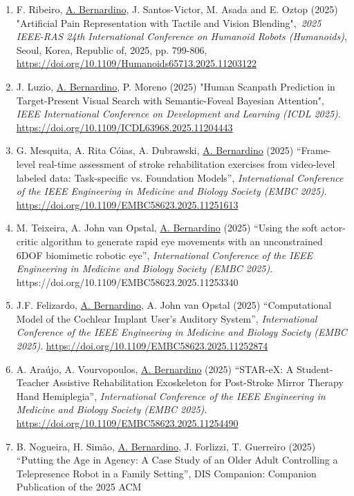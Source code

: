 \begin{enumerate}
  \url{https://doi.org/10.1007/978-3-031-99568-2_14}
\item
  F. Ribeiro, \ul{A. Bernardino}, J. Santos-Victor, M. Asada and E.
  Oztop (2025) "Artificial Pain Representation with Tactile and Vision
  Blending",~\emph{2025 IEEE-RAS 24th International Conference on
  Humanoid Robots (Humanoids)}, Seoul, Korea, Republic of, 2025, pp.
  799-806, \url{https://doi.org/10.1109/Humanoids65713.2025.11203122}
\item
  J. Luzio, \ul{A. Bernardino}, P. Moreno (2025) "Human Scanpath
  Prediction in Target-Present Visual Search with Semantic-Foveal
  Bayesian Attention", \emph{IEEE International Conference on
  Development and Learning (ICDL 2025)}.
  \url{https://doi.org/10.1109/ICDL63968.2025.11204443}
\item
  G. Mesquita, A. Rita Cóias, A. Dubrawski, \ul{A. Bernardino} (2025)
  ``Frame-level real-time assessment of stroke rehabilitation exercises
  from video-level labeled data: Task-specific vs. Foundation Models'',
  \emph{International Conference of the IEEE Engineering in Medicine and
  Biology Society (EMBC 2025)}.
  \url{https://doi.org/10.1109/EMBC58623.2025.11251613}
\item
  M. Teixeira, A. John van Opstal, \ul{A. Bernardino} (2025) ``Using the
  soft actor-critic algorithm to generate rapid eye movements with an
  unconstrained 6DOF biomimetic robotic eye'', \emph{International
  Conference of the IEEE Engineering in Medicine and Biology Society
  (EMBC 2025)}. https://doi.org/10.1109/EMBC58623.2025.11253340
\item
  J.F. Felizardo, \ul{A. Bernardino}, A. John van Opstal (2025)
  ``Computational Model of the Cochlear Implant User's Auditory
  System'', \emph{International Conference of the IEEE Engineering in
  Medicine and Biology Society (EMBC 2025)}.
  \url{https://doi.org/10.1109/EMBC58623.2025.11252874}
\item
  A. Araújo, A. Vourvopoulos, \ul{A. Bernardino} (2025) ``STAR-eX: A
  Student-Teacher Assistive Rehabilitation Exoskeleton for Post-Stroke
  Mirror Therapy Hand Hemiplegia'', \emph{International Conference of
  the IEEE Engineering in Medicine and Biology Society (EMBC 2025).}
  \url{https://doi.org/10.1109/EMBC58623.2025.11254490}
\item
  B. Nogueira, H. Simão, \ul{A. Bernardino}, J. Forlizzi, T. Guerreiro
  (2025) ``Putting the Age in Agency: A Case Study of an Older Adult
  Controlling a Telepresence Robot in a Family Setting'', DIS
   Companion: Companion Publication of the 2025 ACM

\end{enumerate}
